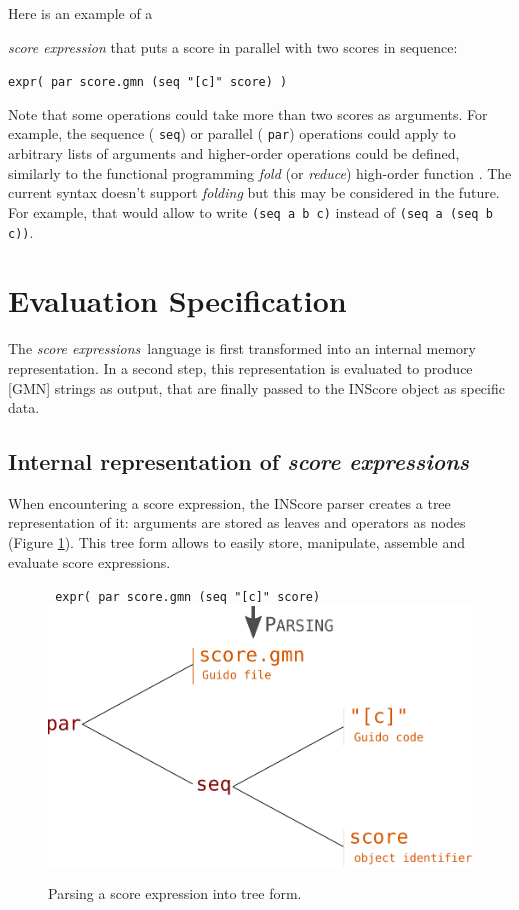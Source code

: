 \documentclass{article}
\newcommand{\OSC}[1]{{\fontsize{9.5pt}{10pt} \selectfont\texttt{#1}}}
\newcommand{\oper}[1]{\textcolor{figRed}{#1}}
\newcommand{\param}[1]{\textcolor{figOrange}{#1}}
\newcommand{\sExpr}{\emph{score expressions}}
\newcommand{\sample}	[1]			{\vspace{-0.2em}\begin{center}\colorbox{mygrey}{\begin{minipage}[t]{0.95\columnwidth} {\small \texttt{#1}}\end{minipage}}\end{center}}
\begin{document}
Here is an example of a {\emph{score expression} that puts a score in parallel with two scores in sequence:
\sample{expr( par score.gmn (seq "[c]" score) )}

Note that some operations could take more than two scores as arguments. For example, the sequence (\OSC{seq}) or parallel (\OSC{par}) operations could apply to arbitrary lists of arguments and higher-order operations could be defined, similarly to the functional programming \emph{fold} (or \emph{reduce}) high-order function \cite{Hutton99}.
The current syntax doesn't support \emph{folding} but this may be considered in the future. For example, that would allow to write \OSC{(seq a b c)} instead of  \OSC{(seq a (seq b c))}.

\section{Evaluation Specification}
\label{evaluationSpec}
The \sExpr\ language is first transformed into an internal memory representation. In a second step, this representation is evaluated to produce [GMN] strings as output, that are finally passed to the INScore object as specific data.

\subsection{Internal representation of \sExpr}

When encountering a score expression, the INScore parser creates a tree representation of it: arguments are stored as leaves and operators as nodes (Figure \ref{fig:parsing}). This tree form allows to easily  store, manipulate, assemble and evaluate score expressions.

\begin{figure}[th]
\centering
\OSC{ expr( \oper{par} \param{score.gmn}  (\oper{seq} \param{"[c]" score})}
\includegraphics[width=0.8\columnwidth]{imgs/exprParse}
\caption{Parsing a score expression into tree form.
\label{fig:parsing}}
\end{figure}

}
\end{document}
